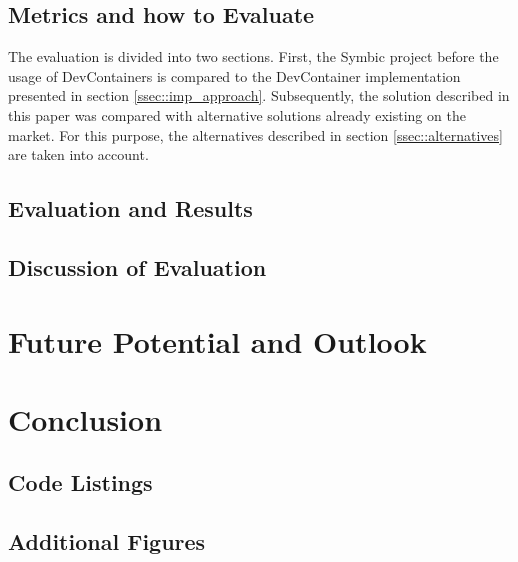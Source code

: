 \documentclass[12pt, a4paper]{article}
\begin{document}
\subsection{Metrics and how to Evaluate}
The evaluation is divided into two sections. First, the Symbic project before the usage of DevContainers is compared to the DevContainer implementation presented in section \ref{ssec::imp_approach}. Subsequently, the solution described in this paper was compared with alternative solutions already existing on the market. For this purpose, the alternatives described in section \ref{ssec::alternatives} are taken into account.\newline

\subsection{Evaluation and Results}\label{sses::eval_compare}
\subsection{Discussion of Evaluation}

\section{Future Potential and Outlook}\label{sec::outlook}
\section{Conclusion}\label{sec::conclusion}


\newpage

\singlespacing{}
\renewcommand{\thesubsection}{\Alph{subsection}}
\setcounter{page}{\value{lastroman}}
\vspace*{\fill}
\vspace*{\fill}



\subsection{Code Listings}


\newpage

\subsection{Additional Figures}

\newpage

\listoffigures
\listoftables
\lstlistoflistings{}
\newpage

% 




% 
\end{document}

